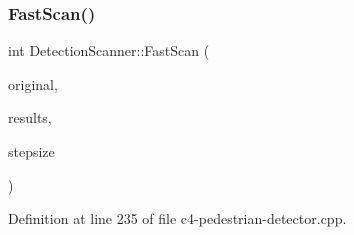 \subsubsection{\texorpdfstring{Fast\+Scan()}{FastScan()}}
{\footnotesize\ttfamily int Detection\+Scanner\+::\+Fast\+Scan (\begin{DoxyParamCaption}\item[{\mbox{\hyperlink{class_int_image}{Int\+Image}}$<$ double $>$ \&}]{original,  }\item[{std\+::vector$<$ cv\+::\+Rect $>$ \&}]{results,  }\item[{const int}]{stepsize }\end{DoxyParamCaption})}



Definition at line 235 of file c4-\/pedestrian-\/detector.\+cpp.


